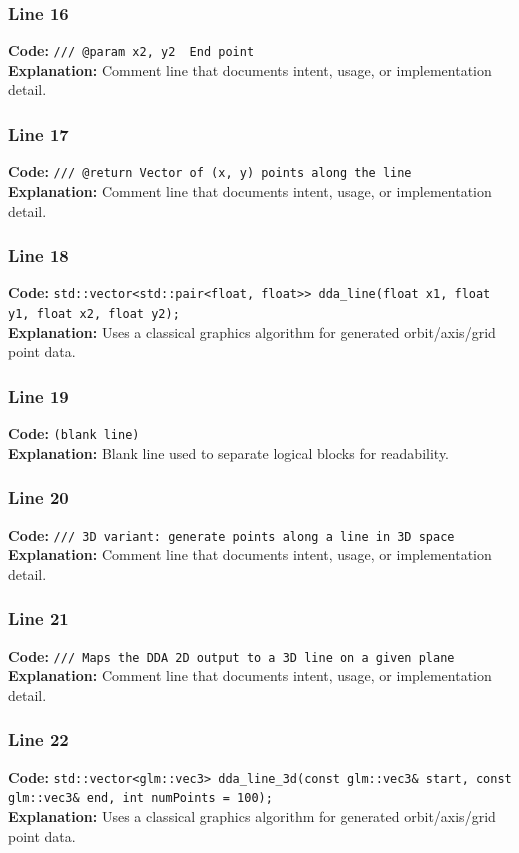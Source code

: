 \documentclass[11pt,a4paper]{article}
\begin{document}
\subsubsection*{Line 16}
\textbf{Code:} \verb|/// @param x2, y2  End point|\\
\textbf{Explanation:} Comment line that documents intent, usage, or implementation detail.

\subsubsection*{Line 17}
\textbf{Code:} \verb|/// @return Vector of (x, y) points along the line|\\
\textbf{Explanation:} Comment line that documents intent, usage, or implementation detail.

\subsubsection*{Line 18}
\textbf{Code:} \verb|std::vector<std::pair<float, float>> dda_line(float x1, float y1, float x2, float y2);|\\
\textbf{Explanation:} Uses a classical graphics algorithm for generated orbit/axis/grid point data.

\subsubsection*{Line 19}
\textbf{Code:} \texttt{(blank line)}\\
\textbf{Explanation:} Blank line used to separate logical blocks for readability.

\subsubsection*{Line 20}
\textbf{Code:} \verb|/// 3D variant: generate points along a line in 3D space|\\
\textbf{Explanation:} Comment line that documents intent, usage, or implementation detail.

\subsubsection*{Line 21}
\textbf{Code:} \verb|/// Maps the DDA 2D output to a 3D line on a given plane|\\
\textbf{Explanation:} Comment line that documents intent, usage, or implementation detail.

\subsubsection*{Line 22}
\textbf{Code:} \verb|std::vector<glm::vec3> dda_line_3d(const glm::vec3& start, const glm::vec3& end, int numPoints = 100);|\\
\textbf{Explanation:} Uses a classical graphics algorithm for generated orbit/axis/grid point data.
\end{document}
